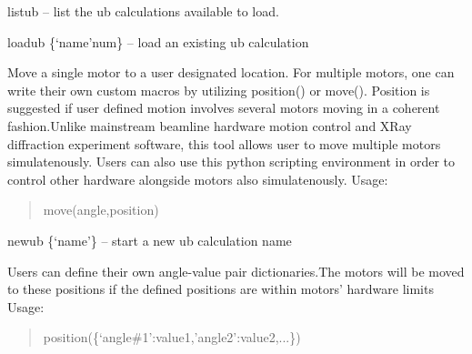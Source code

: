 \documentclass[letterpaper,10pt,english]{sphinxmanual}
\begin{document}

\begin{fulllineitems}
\label{Manual:commands.listub}
listub -- list the ub calculations available to load.

\end{fulllineitems}


\begin{fulllineitems}
\label{Manual:commands.loadub}
loadub \{`name'{\color{red}\bfseries{}\textbar{}}num\} -- load an existing ub calculation

\end{fulllineitems}


\begin{fulllineitems}
\label{Manual:commands.move}
Move a single motor to a user designated location. For multiple motors, one can 
write their own custom macros by utilizing position() or move().
Position is suggested if user defined motion involves several motors moving 
in a coherent fashion.Unlike mainstream beamline hardware motion control
and XRay diffraction experiment software, this tool allows user to move 
multiple motors simulatenously. Users can also use this python scripting environment
in order to control other hardware alongside motors also simulatenously. 
Usage:
\begin{quote}

move(angle,position)
\end{quote}

\end{fulllineitems}


\begin{fulllineitems}
\label{Manual:commands.newub}
newub \{`name'\} -- start a new ub calculation name

\end{fulllineitems}


\begin{fulllineitems}
\label{Manual:commands.position}
Users can define their own angle-value pair dictionaries.The motors will be moved to these positions 
if the defined positions are within motors' hardware limits
Usage:
\begin{quote}

position(\{`angle\#1':value1,'angle2':value2,...\})
\end{quote}

\end{fulllineitems}
\end{document}
